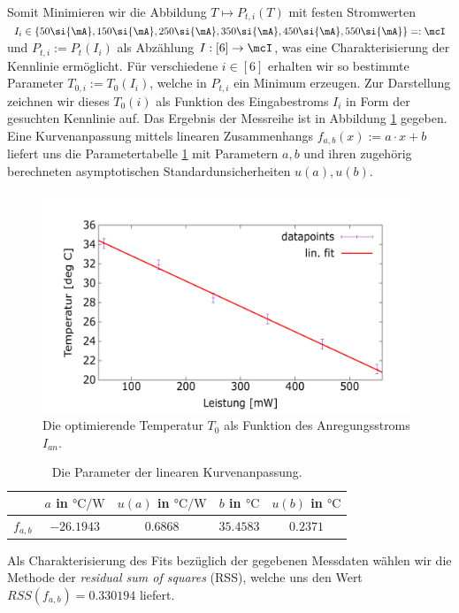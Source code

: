 \documentclass[../../main.tex]{subfiles}
\begin{document}
    Somit Minimieren wir die Abbildung $T\mapsto P_{t,i}(T)$ mit festen Stromwerten $I_i\in\{50\si{\mA},150\si{\mA},250\si{\mA},350\si{\mA},450\si{\mA},550\si{\mA}\}=:\mcI$ und $P_{t,i}:=P_t(I_i)$ als Abzählung $I:[6]\to\mcI$, was eine Charakterisierung der Kennlinie ermöglicht. Für verschiedene $i\in[6]$ erhalten wir so bestimmte Parameter $T_{0,i}:=T_0(I_i)$, welche in $P_{t,i}$ ein Minimum erzeugen. Zur Darstellung zeichnen wir dieses $T_0(i)$ als Funktion des Eingabestroms $I_i$ in Form der gesuchten Kennlinie auf. Das Ergebnis der Messreihe ist in Abbildung \ref{fig:1-2-RasterungEvalMinChgI} gegeben. Eine Kurvenanpassung mittels linearen Zusammenhangs $f_{a,b}(x) := a\cdot x + b$ liefert uns die Parametertabelle \ref{tab:1-2-RasterungEvalMinChgI} mit Parametern $a,b$ und ihren zugehörig berechneten asymptotischen Standardunsicherheiten $u(a),u(b)$.

    \begin{figure}[H]
        \centering
        \includegraphics[width=11cm]{../../Bilddateien/1-2/Rasterung_EvalMin_chgI.png}
        \caption{Die optimierende Temperatur $T_0$ als Funktion des Anregungsstroms $I_{\textit{an}}$.}
        \label{fig:1-2-RasterungEvalMinChgI}
    \end{figure}

    \begin{table}[H]
        \centering
        \begin{tabular}{c|cc|cc}
            \hline
            & $a$ in $\si{\celsius\per\W}$ & $u(a)$ in $\si{\celsius\per\W}$ & $b$ in $\si{\celsius}$ & $u(b)$ in $\si{\celsius}$ \\
            \hline\hline
            $f_{a,b}$ & $-26.1943$ & $0.6868$ & $35.4583$ & $0.2371$ \\
            \hline
        \end{tabular}
        \caption{Die Parameter der linearen Kurvenanpassung.}
        \label{tab:1-2-RasterungEvalMinChgI}
    \end{table}
    Als Charakterisierung des Fits bezüglich der gegebenen Messdaten wählen wir die Methode der \emph{residual sum of squares} (RSS), welche uns den Wert $RSS(f_{a,b}) = 0.330194$ liefert. 
\end{document}
